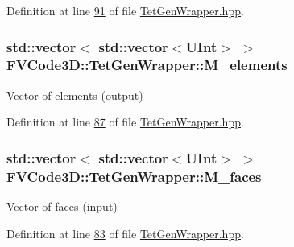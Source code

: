 Definition at line \hyperlink{TetGenWrapper_8hpp_source_l00091}{91} of file \hyperlink{TetGenWrapper_8hpp_source}{Tet\+Gen\+Wrapper.\+hpp}.

\subsubsection[{\texorpdfstring{M\+\_\+elements}{M_elements}}]{\setlength{\rightskip}{0pt plus 5cm}std\+::vector$<$ std\+::vector$<${\bf U\+Int}$>$ $>$ F\+V\+Code3\+D\+::\+Tet\+Gen\+Wrapper\+::\+M\+\_\+elements\hspace{0.3cm}{\ttfamily [private]}}\hypertarget{classFVCode3D_1_1TetGenWrapper_a016da330a68cb7cd44881dc26efed5b5}{}\label{classFVCode3D_1_1TetGenWrapper_a016da330a68cb7cd44881dc26efed5b5}


Vector of elements (output) 



Definition at line \hyperlink{TetGenWrapper_8hpp_source_l00087}{87} of file \hyperlink{TetGenWrapper_8hpp_source}{Tet\+Gen\+Wrapper.\+hpp}.

\subsubsection[{\texorpdfstring{M\+\_\+faces}{M_faces}}]{\setlength{\rightskip}{0pt plus 5cm}std\+::vector$<$ std\+::vector$<${\bf U\+Int}$>$ $>$ F\+V\+Code3\+D\+::\+Tet\+Gen\+Wrapper\+::\+M\+\_\+faces\hspace{0.3cm}{\ttfamily [private]}}\hypertarget{classFVCode3D_1_1TetGenWrapper_ae883359645d72961078fe02a886df3be}{}\label{classFVCode3D_1_1TetGenWrapper_ae883359645d72961078fe02a886df3be}


Vector of faces (input) 



Definition at line \hyperlink{TetGenWrapper_8hpp_source_l00083}{83} of file \hyperlink{TetGenWrapper_8hpp_source}{Tet\+Gen\+Wrapper.\+hpp}.

